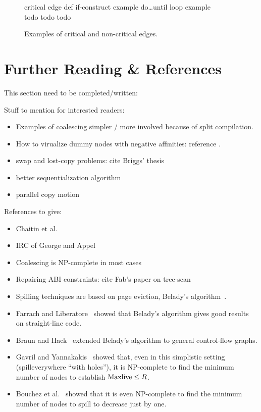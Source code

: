 {\begin{figure}
  critical edge def \hfill if-construct example \hfill do\dots until loop example\\
  todo \hfill todo \hfill todo

  \caption{Examples of critical and non-critical edges.}
  \label{fig:reg-critical}
\end{figure}


\section{Further Reading \& References}
\label{sec:reg-further-reading}

This section need to be completed/written:

Stuff to mention for interested readers:
\begin{itemize}
  \item Examples of coalescing simpler / more involved because of split compilation.
  \item How to virualize dummy nodes with negative affinities: reference \cite{todo}.
  \item swap and lost-copy problems: cite Briggs' thesis
  \item better sequentialization algorithm
  \item parallel copy motion
\end{itemize}

References to give:
\begin{itemize}
  \item Chaitin et al.~\cite{chaitin:1981:register}
  \item IRC of George and Appel~\cite{george:96:iterated}
  \item Coalescing is NP-complete in most cases~\cite{BouchezDR07:coalescing-cplx}
  \item Repairing ABI constraints: cite Fab's paper on tree-scan~\cite{todo}
  \item Spilling techniques are based on page eviction, Belady's algorithm~\cite{belady:1966:storage}.
  \item Farrach and Liberatore~\cite{farach:98:local} showed that Belady's algorithm gives good results on straight-line code.
  \item Braun and Hack~\cite{Braun:2009:CC} extended Belady's algorithm to general control-flow graphs.

  \item Gavril and Yannakakis~\cite{YannakakisGavril87} showed that, even in this simplistic setting (spilleverywhere ``with holes''), it is NP-complete to find the minimum number of nodes to establish $\mathrm{Maxlive}\le R$.
  \item Bouchez et al.~\cite{BouchezDR07:spill} showed that it is even NP-complete to find the minimum number of nodes to spill to decrease \maxlive just by one.
\end{itemize}


}
